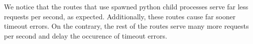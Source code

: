We notice that the routes that use spawned python child processes serve far less requests per second, as expected. Additionally, these routes cause far sooner timeout errors. On the contrary, the rest of the routes serve many more requests per second and delay the occurence of timeout errors.







